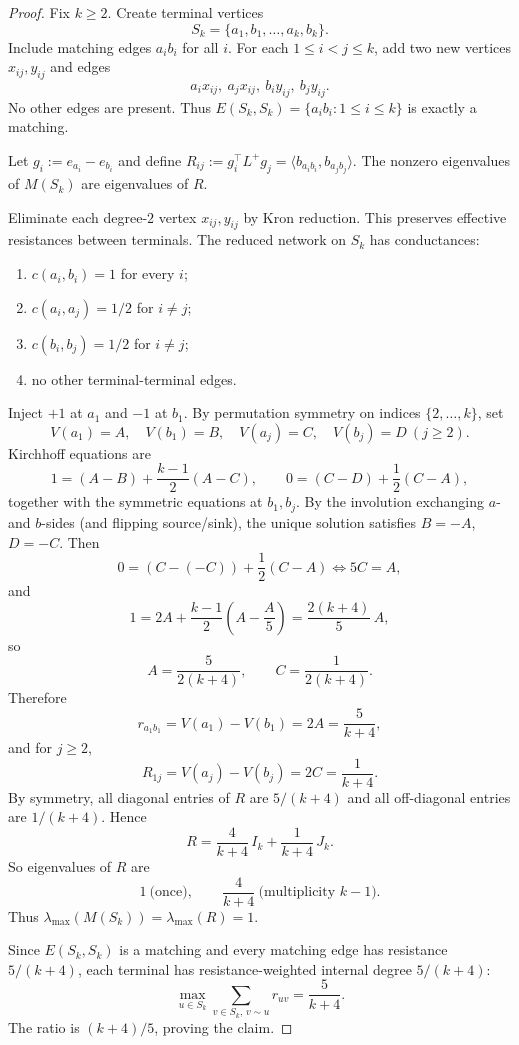 \begin{proof}
Fix $k\ge 2$.
Create terminal vertices
\[
S_k=\{a_1,b_1,\dots,a_k,b_k\}.
\]
Include matching edges $a_i b_i$ for all $i$.
For each $1\le i<j\le k$, add two new vertices $x_{ij},y_{ij}$ and edges
\[
a_i x_{ij},\ a_j x_{ij},\ b_i y_{ij},\ b_j y_{ij}.
\]
No other edges are present.
Thus $E(S_k,S_k)=\{a_i b_i:1\le i\le k\}$ is exactly a matching.

Let $g_i:=e_{a_i}-e_{b_i}$ and define
$R_{ij}:=g_i^\top L^+ g_j=\langle b_{a_i b_i}, b_{a_j b_j}\rangle$.
The nonzero eigenvalues of $M(S_k)$ are eigenvalues of $R$.

Eliminate each degree-$2$ vertex $x_{ij},y_{ij}$ by
Kron reduction. This preserves effective resistances between terminals.
The reduced network on $S_k$ has conductances:
\begin{enumerate}[nosep]
\item $c(a_i,b_i)=1$ for every $i$;
\item $c(a_i,a_j)=1/2$ for $i\ne j$;
\item $c(b_i,b_j)=1/2$ for $i\ne j$;
\item no other terminal-terminal edges.
\end{enumerate}

Inject $+1$ at $a_1$ and $-1$ at $b_1$.
By permutation symmetry on indices $\{2,\dots,k\}$, set
\[
V(a_1)=A,\quad V(b_1)=B,\quad
V(a_j)=C,\quad V(b_j)=D\ (j\ge 2).
\]
Kirchhoff equations are
\[
1=(A-B)+\frac{k-1}{2}(A-C),\qquad
0=(C-D)+\frac12(C-A),
\]
together with the symmetric equations at $b_1,b_j$.
By the involution exchanging $a$- and $b$-sides (and flipping source/sink),
the unique solution satisfies $B=-A$, $D=-C$.
Then
\[
0=(C-(-C))+\frac12(C-A)\iff 5C=A,
\]
and
\[
1=2A+\frac{k-1}{2}\!\left(A-\frac A5\right)
 =\frac{2(k+4)}{5}\,A,
\]
so
\[
A=\frac{5}{2(k+4)},\qquad
C=\frac{1}{2(k+4)}.
\]
Therefore
\[
r_{a_1b_1}=V(a_1)-V(b_1)=2A=\frac{5}{k+4},
\]
and for $j\ge2$,
\[
R_{1j}=V(a_j)-V(b_j)=2C=\frac{1}{k+4}.
\]
By symmetry, all diagonal entries of $R$ are $5/(k+4)$ and all off-diagonal
entries are $1/(k+4)$. Hence
\[
R=\frac{4}{k+4}\,I_k+\frac{1}{k+4}\,J_k.
\]
So eigenvalues of $R$ are
\[
1\ \text{(once)},\qquad \frac{4}{k+4}\ \text{(multiplicity $k-1$)}.
\]
Thus $\lambda_{\max}(M(S_k))=\lambda_{\max}(R)=1$.

Since $E(S_k,S_k)$ is a matching and every matching edge has resistance
$5/(k+4)$, each terminal has resistance-weighted internal degree $5/(k+4)$:
\[
\max_{u\in S_k}\sum_{v\in S_k,\,v\sim u} r_{uv}
 =\frac{5}{k+4}.
\]
The ratio is $(k+4)/5$, proving the claim.
\end{proof}

